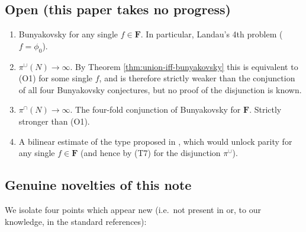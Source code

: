 \documentclass[11pt]{article}
\theoremstyle{definition}
\newcommand{\F}{\mathbf{F}}
\newcommand{\F}{\mathcal{F}}
\begin{document}
\subsection{Open (this paper takes no progress)}

\begin{enumerate}
\item[(O1)] Bunyakovsky for any single $f\in\F$. In particular, Landau's 4th problem ($f=\phi_0$).
\item[(O2)] $\pi^\cup(N)\to\infty$. By Theorem \ref{thm:union-iff-bunyakovsky} this is equivalent to (O1) for some single $f$, and is therefore strictly weaker than the conjunction of all four Bunyakovsky conjectures, but no proof of the disjunction is known.
\item[(O3)] $\pi^\cap(N)\to\infty$. The four-fold conjunction of Bunyakovsky for $\F$. Strictly stronger than (O1).
\item[(O4)] A bilinear estimate of the type proposed in \cite[Question 3.4]{B8}, which would unlock parity for any single $f\in\F$ (and hence by (T7) for the disjunction $\pi^\cup$).
\end{enumerate}

\subsection{Genuine novelties of this note}

We isolate four points which appear new (i.e.\ not present in \cite{shakov,B8} or, to our knowledge, in the standard references):
\end{document}
